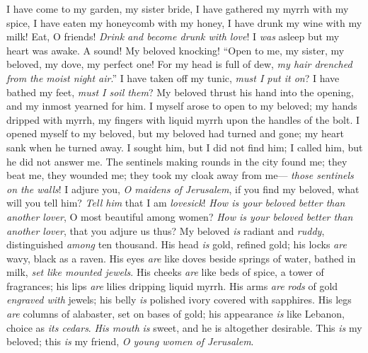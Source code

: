 \begin{biblechapter} %
\verse I have come to my garden, my sister bride, 
I have gathered my myrrh with my spice, 
I have eaten my honeycomb with my honey, 
I have drunk my wine with my milk! 
Eat, O friends! \textit{Drink and become drunk \textit{with} love}!
 I \textit{was} asleep but my heart was awake. 
A sound! My beloved knocking! 
“Open to me, my sister, my beloved, 
my dove, my perfect one! 
For my head is full of dew, 
\textit{my hair drenched from the moist night air}.”
\verse I have taken off my tunic, \textit{must I put it on}? 
I have bathed my feet, \textit{must I soil them}?
\verse My beloved thrust his hand into the opening, 
and my inmost yearned for him.
\verse I myself arose to open to my beloved; 
my hands dripped with myrrh, 
my fingers with liquid myrrh 
upon the handles of the bolt.
\verse I opened myself to my beloved, 
but my beloved had turned and gone; 
my heart sank when he turned away. 
I sought him, but I did not find him; 
I called him, but he did not answer me.
\verse The sentinels making rounds in the city found me; 
they beat me, they wounded me; 
they took my cloak away from me— 
\textit{those sentinels on the walls}!
 I adjure you, \textit{O maidens of Jerusalem}, 
if you find my beloved, what will you tell him? 
\textit{Tell him} that I am \textit{lovesick}!
 \textit{How is your beloved better than another lover}, 
O most beautiful among women? 
\textit{How is your beloved better than another lover},  
that you adjure us thus?
\verse My beloved \textit{is} radiant and \textit{ruddy}, 
distinguished \textit{among} ten thousand.
\verse His head \textit{is} gold, refined gold; 
his locks \textit{are} wavy, black as a raven.
\verse His eyes \textit{are} like doves beside springs of water, 
bathed in milk, \textit{set like mounted jewels}.
\verse His cheeks \textit{are} like beds of spice, a tower of fragrances; 
his lips \textit{are} lilies dripping liquid myrrh.
\verse His arms \textit{are} \textit{rods} of gold \textit{engraved with} jewels; 
his belly \textit{is} polished ivory covered with sapphires.
\verse His legs \textit{are} columns of alabaster, set on bases of gold; 
his appearance \textit{is} like Lebanon, choice as \textit{its cedars}.
\verse \textit{His mouth} \textit{is} sweet, 
and he is altogether desirable. 
This \textit{is} my beloved; 
this \textit{is} my friend, \textit{O young women of Jerusalem}.
\end{biblechapter}

